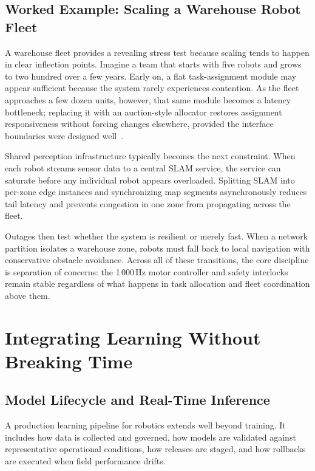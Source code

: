 \documentclass[smallextended]{svjour3}
\begin{document}
\subsection{Worked Example: Scaling a Warehouse Robot Fleet}

A warehouse fleet provides a revealing stress test because scaling tends to happen in clear inflection points. Imagine a team that starts with five robots and grows to two hundred over a few years. Early on, a flat task-assignment module may appear
sufficient because the system rarely experiences contention. As the fleet approaches a few dozen units, however, that same module becomes a latency bottleneck; replacing it with an auction-style allocator restores assignment responsiveness without forcing
changes elsewhere, provided the interface boundaries were designed well~\cite{wurman2008}.

Shared perception infrastructure typically becomes the next constraint. When each robot streams sensor data to a central SLAM service, the service can saturate before any individual robot appears overloaded. Splitting SLAM into per-zone edge instances and synchronizing map segments asynchronously reduces tail latency and prevents congestion in one zone from propagating across the fleet.

Outages then test whether the system is resilient or merely fast. When a network partition isolates a warehouse zone, robots must fall back to local navigation with conservative obstacle avoidance. Across all of these transitions, the core discipline is separation of concerns: the 1\,000\,Hz motor controller and safety interlocks remain stable regardless of what happens in task allocation and fleet coordination above them.

\section{Integrating Learning Without Breaking Time}
\label{sec:learn}

\subsection{Model Lifecycle and Real-Time Inference}

A production learning pipeline for robotics extends well beyond training. It includes how data is collected and governed, how models are validated against representative operational conditions, how releases are staged, and how rollbacks are executed when field performance drifts.
\end{document}
